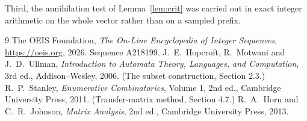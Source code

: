 \documentclass[11pt,a4paper]{article}
\theoremstyle{plain}
\theoremstyle{definition}
\begin{document}
Third, the annihilation test of Lemma~\ref{lem:crit} was carried out in exact integer
arithmetic on the whole vector rather than on a sampled prefix.

\begin{thebibliography}{9}
 The OEIS Foundation, \emph{The On-Line Encyclopedia of Integer
Sequences}, \url{https://oeis.org}, 2026. Sequence A218199.
 J.~E.~Hopcroft, R.~Motwani and J.~D.~Ullman, \emph{Introduction to Automata
Theory, Languages, and Computation}, 3rd ed., Addison--Wesley, 2006. (The subset
construction, Section 2.3.)
 R.~P.~Stanley, \emph{Enumerative Combinatorics}, Volume 1, 2nd ed.,
Cambridge University Press, 2011. (Transfer-matrix method, Section 4.7.)
 R.~A.~Horn and C.~R.~Johnson, \emph{Matrix Analysis}, 2nd ed., Cambridge
University Press, 2013.
\end{thebibliography}
\end{document}
